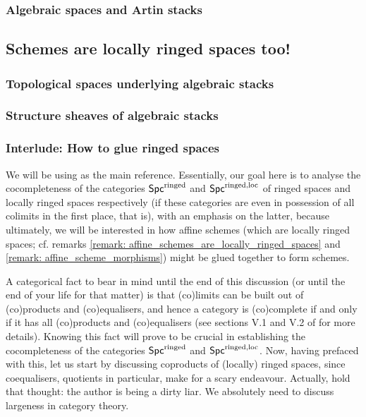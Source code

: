 \begin{remark}
            \end{remark}
            \begin{example} \label{example: infinite_product_of_affine_schemes}
                
            \end{example}
                    
            \subsubsection{Algebraic spaces and Artin stacks}
            
        \subsection{Schemes are locally ringed spaces too!}
            \subsubsection{Topological spaces underlying algebraic stacks}
            
            \subsubsection{Structure sheaves of algebraic stacks}
            
            \subsubsection{Interlude: How to glue ringed spaces}
                We will be using \cite{schwede_gluing} as the main reference. Essentially, our goal here is to analyse the cocompleteness of the categories $\mathsf{Spc}^{\mathrm{ringed}}$ and $\mathsf{Spc}^{\mathrm{ringed}, \mathrm{loc}}$ of ringed spaces and locally ringed spaces respectively (if these categories are even in possession of all colimits in the first place, that is), with an emphasis on the latter, because ultimately, we will be interested in how affine schemes (which are locally ringed spaces; cf. remarks \ref{remark: affine_schemes_are_locally_ringed_spaces} and \ref{remark: affine_scheme_morphisms}) might be glued together to form schemes. 
                
                A categorical fact to bear in mind until the end of this discussion (or until the end of your life for that matter) is that (co)limits can be built out of (co)products and (co)equalisers, and hence a category is (co)complete if and only if it has all (co)products and (co)equalisers (see sections V.1 and V.2 of \cite{maclane} for more details). Knowing this fact will prove to be crucial in establishing the cocompleteness of the categories $\mathsf{Spc}^{\mathrm{ringed}}$ and $\mathsf{Spc}^{\mathrm{ringed}, \mathrm{loc}}$. Now, having prefaced with this, let us start by discussing coproducts of (locally) ringed spaces, since coequalisers, quotients in particular, make for a scary endeavour. Actually, hold that thought: the author is being a dirty liar. We absolutely need to discuss largeness in category theory.
                
